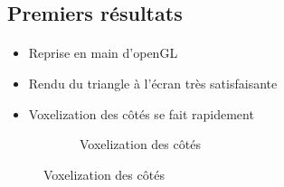 \subsection{Premiers résultats}

\begin{frame}[fragile=singleslide]{\insertsectionhead}

  \framesubtitle{\insertsubsectionhead}
  \begin{itemize}
    \item Reprise en main d'openGL
    \vspace{.3cm}
    \item Rendu du triangle à l'écran très satisfaisante
    \vspace{.3cm}
    \item Voxelization des côtés se fait rapidement
  \end{itemize}
  \vspace{.4cm}
  \begin{figure}
        \begin{subfigure}{0.6\textwidth}
          \caption*{Voxelization des côtés}
        \end{subfigure}
      \end{figure}
\end{frame}

